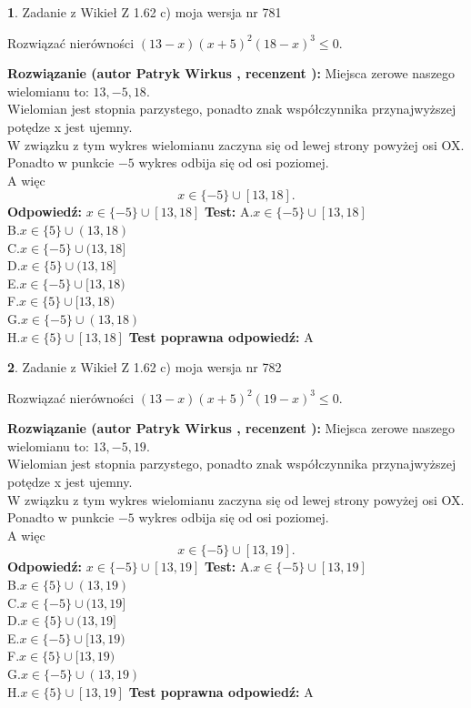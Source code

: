 \documentclass[12pt, a4paper]{article}
\theoremstyle{definition} %
\newtheorem{zad}{}
\newcommand{\zadStart}[1]{\begin{zad}#1\newline}
\newcommand{\zadStop}{\end{zad}}
\newcommand{\rozwStart}[2]{\noindent \textbf{Rozwiązanie (autor #1 , recenzent #2): }\newline}
\newcommand{\rozwStop}{\newline}
\newcommand{\odpStart}{\noindent \textbf{Odpowiedź:}\newline}
\newcommand{\odpStop}{\newline}
\newcommand{\testStart}{\noindent \textbf{Test:}\newline}
\newcommand{\testStop}{\newline}
\newcommand{\kluczStart}{\noindent \textbf{Test poprawna odpowiedź:}\newline}
\newcommand{\kluczStop}{\newline}
\begin{document}
\zadStart{Zadanie z Wikieł Z 1.62 c) moja wersja nr 781}

Rozwiązać nierówności $(13-x)(x+5)^{2}(18-x)^{3}\le0$.
\zadStop
\rozwStart{Patryk Wirkus}{}
Miejsca zerowe naszego wielomianu to: $13, -5, 18$.\\
Wielomian jest stopnia parzystego, ponadto znak współczynnika przy\linebreak najwyższej potędze x jest ujemny.\\ W związku z tym wykres wielomianu zaczyna się od lewej strony powyżej osi OX.\\
Ponadto w punkcie $-5$ wykres odbija się od osi poziomej.\\
A więc $$x \in \{-5\} \cup [13,18].$$
\rozwStop
\odpStart
$x \in \{-5\} \cup [13,18]$
\odpStop
\testStart
A.$x \in \{-5\} \cup [13,18]$\\
B.$x \in \{5\} \cup (13,18)$\\
C.$x \in \{-5\} \cup (13,18]$\\
D.$x \in \{5\} \cup (13,18]$\\
E.$x \in \{-5\} \cup [13,18)$\\
F.$x \in \{5\} \cup [13,18)$\\
G.$x \in \{-5\} \cup (13,18)$\\
H.$x \in \{5\} \cup [13,18]$
\testStop
\kluczStart
A
\kluczStop



\zadStart{Zadanie z Wikieł Z 1.62 c) moja wersja nr 782}

Rozwiązać nierówności $(13-x)(x+5)^{2}(19-x)^{3}\le0$.
\zadStop
\rozwStart{Patryk Wirkus}{}
Miejsca zerowe naszego wielomianu to: $13, -5, 19$.\\
Wielomian jest stopnia parzystego, ponadto znak współczynnika przy\linebreak najwyższej potędze x jest ujemny.\\ W związku z tym wykres wielomianu zaczyna się od lewej strony powyżej osi OX.\\
Ponadto w punkcie $-5$ wykres odbija się od osi poziomej.\\
A więc $$x \in \{-5\} \cup [13,19].$$
\rozwStop
\odpStart
$x \in \{-5\} \cup [13,19]$
\odpStop
\testStart
A.$x \in \{-5\} \cup [13,19]$\\
B.$x \in \{5\} \cup (13,19)$\\
C.$x \in \{-5\} \cup (13,19]$\\
D.$x \in \{5\} \cup (13,19]$\\
E.$x \in \{-5\} \cup [13,19)$\\
F.$x \in \{5\} \cup [13,19)$\\
G.$x \in \{-5\} \cup (13,19)$\\
H.$x \in \{5\} \cup [13,19]$
\testStop
\kluczStart
A
\kluczStop
\end{document}

